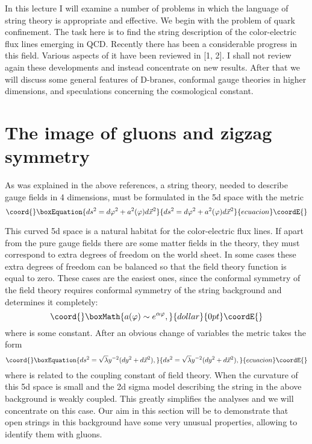 \documentclass[a4paper,12pt]{article}
\begin{document}
In this lecture I will examine a number of problems in which the language of
string theory is appropriate and effective. We begin with the problem of
quark confinement. The task here is to find the string description of the
color-electric flux lines emerging in QCD. Recently there has been a
considerable progress in this field. Various aspects of it have been
reviewed in [1, 2]. I shall not review again these developments and instead
concentrate on new results. After that we will discuss some general features
of D-branes, conformal gauge theories in higher dimensions, and speculations
concerning the cosmological constant.

\section{The image of gluons and zigzag symmetry}

As was explained in the above references, a string theory, needed to
describe gauge fields in 4 dimensions, must be formulated in the 5d space
with the metric 
\begin{equation}\coord{}\boxEquation{
ds^{2}=d\varphi ^{2}+a^{2}(\varphi )d\vec{x}^{2}
}{
ds^{2}=d\varphi ^{2}+a^{2}(\varphi )d\vec{x}^{2}
}{ecuacion}\coordE{}\end{equation}

This curved 5d space is a natural habitat for the color-electric flux
lines. If apart from the pure gauge fields there are some matter fields in
the theory, they must correspond to extra degrees of freedom on the world
sheet. In some cases these extra degrees of freedom can be balanced so that
the field theory \myHighlight{$\beta -$}\coordHE{}function is equal to zero. These cases are the
easiest ones, since the conformal symmetry of the field theory requires
conformal symmetry of the string background and determines it completely:
$$\coord{}\boxMath{
a(\varphi )\sim e^{\alpha \varphi },
}{dollar}{0pt}\coordE{}$$
where \myHighlight{$\alpha $}\coordHE{} is some constant. After an obvious change of variables the
metric takes the form 
\begin{equation}\coord{}\boxEquation{
ds^{2}=\sqrt{\lambda }y^{-2}(dy^{2}+d\vec{x}^{2}),
}{
ds^{2}=\sqrt{\lambda }y^{-2}(dy^{2}+d\vec{x}^{2}),
}{ecuacion}\coordE{}\end{equation}
where \myHighlight{$\lambda $}\coordHE{} is related to the coupling constant of field theory. When \coordHE{} the curvature of this 5d space is small and the 2d sigma
model describing the string in the above background is weakly coupled. This
greatly simplifies the analyses and we will concentrate on this case. Our
aim in this section will be to demonstrate that open strings in this
background have some very unusual properties, allowing to identify them with
gluons.
\end{document}
